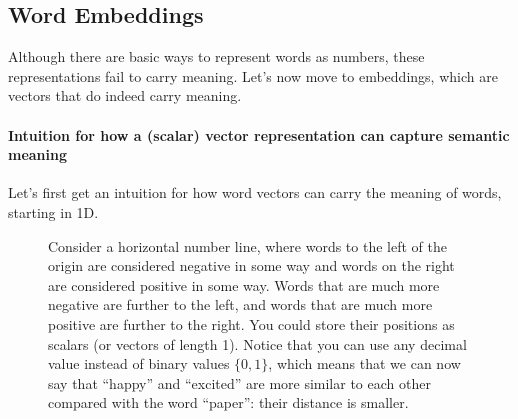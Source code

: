 \documentclass[12pt]{article}
\begin{document}
\subsection{Word Embeddings} Although there are basic ways to represent words as numbers, these representations fail to carry meaning. Let's now move to embeddings, which are vectors that do indeed carry meaning.

\paragraph{Intuition for how a (scalar) vector representation can capture semantic meaning}
Let's first get an intuition for how word vectors can carry the meaning of words, starting in 1D.

\begin{figure}[h]
  \begin{center}
\caption{Consider a horizontal number line, where words to the left of the origin are considered negative in some way and words on the right are considered positive in some way. Words that are much more negative are further to the left, and words that are much more positive are further to the right. You could store their positions as scalars (or vectors of length 1). Notice that you can use any decimal value instead of binary values $\{0, 1\}$, which means that we can now say that ``happy'' and ``excited'' are more similar to each other compared with the word ``paper'': their distance is smaller.}
\end{center}
\end{figure}
\end{document}
